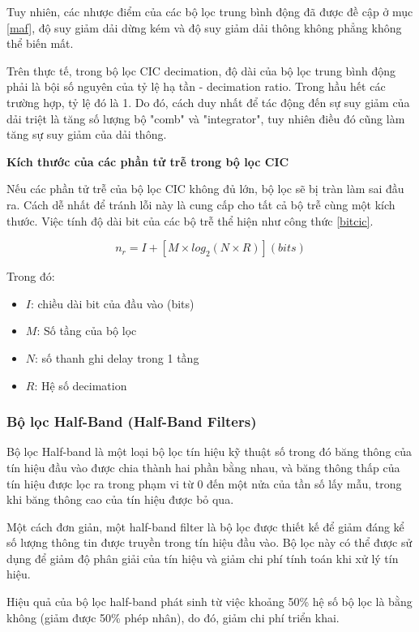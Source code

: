 Tuy nhiên, các nhược điểm của các bộ lọc trung bình động đã được đề cập ở mục \ref{maf}, độ suy giảm dải dừng kém và độ suy giảm dải thông không phẳng không thể biến mất.

Trên thực tế, trong bộ lọc CIC decimation, độ dài của bộ lọc trung bình động phải là bội số nguyên của tỷ lệ hạ tần - decimation ratio. Trong hầu hết các trường hợp, tỷ lệ đó là 1. Do đó, cách duy nhất để tác động đến sự suy giảm của dải triệt là tăng số lượng bộ "comb" và "integrator", tuy nhiên điều đó cũng làm tăng sự suy giảm của dải thông.

\textbf{Kích thước của các phần tử trễ trong bộ lọc CIC}

Nếu các phần tử trễ của bộ lọc CIC không đủ lớn, bộ lọc sẽ bị tràn làm sai đầu ra. Cách dễ nhất để tránh lỗi này là cung cấp cho tất cả bộ trễ cùng một kích thước. Việc tính độ dài bit của các bộ trễ thể hiện như công thức \ref{bitcic}.

\begin{equation} \label{bitcic}
    n_r = I + [M \times log_2(N \times R)] (bits)
\end{equation}

Trong đó:
\begin{itemize}
    \item $I$: chiều dài bit của đầu vào (bits)
    \item $M$: Số tầng của bộ lọc
    \item $N$: số thanh ghi delay trong 1 tầng
    \item $R$: Hệ số decimation
\end{itemize}
\subsubsection{Bộ lọc Half-Band (Half-Band Filters)}
Bộ lọc Half-band là một loại bộ lọc tín hiệu kỹ thuật số trong đó băng thông của tín hiệu đầu vào được chia thành hai phần bằng nhau, và băng thông thấp của tín hiệu được lọc ra trong phạm vi từ 0 đến một nửa của tần số lấy mẫu, trong khi băng thông cao của tín hiệu được bỏ qua.

Một cách đơn giản, một half-band filter là bộ lọc được thiết kế để giảm đáng kể số lượng thông tin được truyền trong tín hiệu đầu vào. Bộ lọc này có thể được sử dụng để giảm độ phân giải của tín hiệu và giảm chi phí tính toán khi xử lý tín hiệu.

 Hiệu quả của bộ lọc half-band phát sinh từ việc khoảng 50\% hệ số bộ lọc là bằng không (giảm được 50\% phép nhân), do đó, giảm chi phí triển khai. \cite{half_band}

